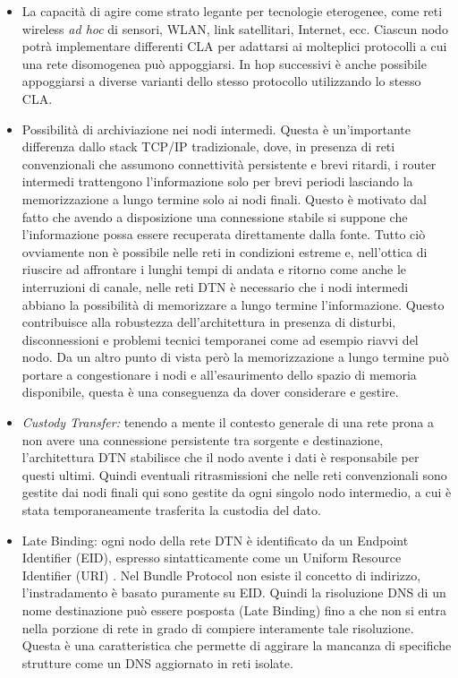 \documentclass[12pt,a4paper,oneside]{book}
\begin{document}
		\begin{itemize}
			\item La capacità di agire come strato legante per tecnologie eterogenee, come reti wireless {\it ad hoc} di sensori, WLAN, link satellitari, Internet, ecc. Ciascun nodo potrà implementare differenti CLA per adattarsi ai molteplici protocolli a cui una rete disomogenea può appoggiarsi. In hop successivi è anche possibile appoggiarsi a diverse varianti dello stesso protocollo utilizzando lo stesso CLA. 
			
			\item Possibilità di archiviazione nei nodi intermedi. Questa è un'importante differenza dallo stack TCP/IP tradizionale, dove, in presenza di reti convenzionali che assumono connettività persistente e brevi ritardi, i router intermedi trattengono l'informazione solo per brevi periodi lasciando la memorizzazione a lungo termine solo ai nodi finali. Questo è motivato dal fatto che avendo a disposizione una connessione stabile si suppone che l'informazione possa essere recuperata direttamente dalla fonte. Tutto ciò ovviamente non è possibile nelle reti in condizioni estreme e, nell'ottica di riuscire ad affrontare i lunghi tempi di andata e ritorno come anche le interruzioni di canale, nelle reti DTN è necessario che i nodi intermedi abbiano la possibilità di memorizzare a lungo termine l'informazione. Questo contribuisce alla robustezza dell'architettura in presenza di disturbi, disconnessioni e problemi tecnici temporanei come ad esempio riavvi del nodo. Da un altro punto di vista però la memorizzazione a lungo termine può portare a congestionare i nodi e all'esaurimento dello spazio di memoria disponibile, questa è una conseguenza da dover considerare e gestire.
			
			\item {\it Custody Transfer:} tenendo a mente il contesto generale di una rete prona a non avere una connessione persistente tra sorgente e destinazione, l'architettura DTN stabilisce che il nodo avente i dati è responsabile per questi ultimi. Quindi eventuali ritrasmissioni che nelle reti convenzionali sono gestite dai nodi finali qui sono gestite da ogni singolo nodo intermedio, a cui è stata temporaneamente trasferita la custodia del dato.
			
			\item Late Binding: ogni nodo della rete DTN è identificato da un Endpoint Identifier (EID), espresso sintatticamente come un Uniform Resource Identifier (URI) \cite{berners2005rfc}. Nel Bundle Protocol non esiste il concetto di indirizzo, l'instradamento è basato puramente su EID. Quindi la risoluzione DNS di un nome destinazione può essere posposta (Late Binding) fino a che non si entra nella porzione di rete in grado di compiere interamente tale risoluzione. Questa è una caratteristica che permette di aggirare la mancanza di specifiche strutture come un DNS aggiornato in reti isolate.
			

\end{itemize}
\end{document}
